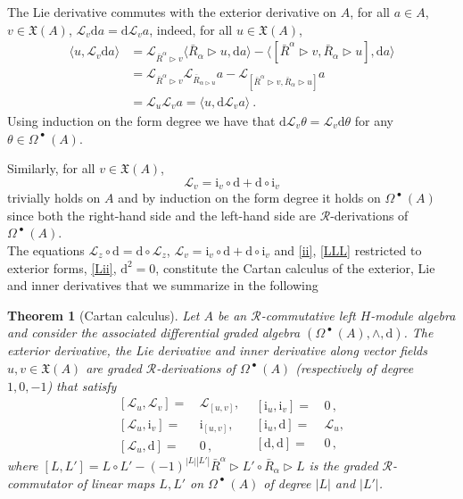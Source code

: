 \documentclass[12pt]{article}
\numberwithin{equation}{section}
\theoremstyle{plain}
\newtheorem{theorem}[proposition]{Theorem}
\theoremstyle{definition}
\theoremstyle{remark}
\def\Vect{\mathfrak{X}}
\def\dd{\mathrm{d}}
\def\ra{\triangleright}
\def\LLL{\mathscr{L}^{\mathcal{}}}
\def\LL{\mathscr{L}^{\mathcal{}}}
\def\le{\langle}
\def\re{\rangle}
\def\le{\langle}
\def\re{\rangle}
\def\dd{{\nabla}}
\def\ii{\mathrm{i}}
\def\oR{\bar R}
\def\al{\alpha}
\def\dd{\mathrm{d}}
\def\OM{{\Omega^{\!\!\;\bullet}\!\!\:(A)}}
\begin{document}
The Lie derivative commutes with the exterior derivative on $A$, for
all $a\in A$, $v\in \Vect(A)$, 
$\LLL_v\dd a=\dd \LLL_v a$, indeed, for all $u \in \Vect(A)$,
\begin{equation*}
  \begin{split}\le u,\LLL_v\dd a\re&=\LL_{\oR^\al\ra v}\le\oR_\al\ra u,\dd
  a\re-\le[\oR^\al\ra v,\oR_\al\ra u],\dd
  a\re \\
 & =\LL_{\oR^\al \ra v}\LL_{\oR_{\al\ra u}} a-\LL_{[\oR^\al\ra v,\oR_\al\ra
    u]}a\\[.2em]
  &=\LL_u\LL_va
  =\le u,\dd\LL_v a\re~.
\end{split}
\end{equation*}
Using induction on the form degree we have that $\dd
\LLL_v\theta=\LLL_v\dd\theta$ for any $\theta\in \OM$.

Similarly, for all $v\in \Vect(A)$,
$$\LLL_v=\ii_v\circ \dd+\dd\circ \ii_v$$ trivially holds on $A$ and  by
induction on the form degree it holds on
$\OM$ since both the right-hand side and the left-hand side are
 ${\mathcal{R}}$-derivations of
$\OM$.
\\

The equations $\LLL_z\circ \dd =\dd\circ \LLL_z$, $\LLL_v=\ii_v\circ \dd+\dd\circ \ii_v $ and  \eqref{ii}, \eqref{LLL} restricted to exterior forms,
\eqref{Lii}, $\dd^2=0$,  constitute the Cartan calculus of the
exterior, Lie and inner derivatives \cite{Gurevich, Weber} that we
summarize in the following


\begin{theorem}[Cartan calculus]
Let ${A}$ be an  ${\mathcal{R}}$-commutative left $H$-module algebra
and consider the associated differential graded algebra
$(\OM,\wedge,\mathrm{d})$. 
The exterior derivative, the Lie derivative and inner derivative along vector fields
$u,v\in \Vect(A)$ are graded  ${\mathcal{R}}$-derivations of
$\OM$ (respectively of degree $1,0,
-1$) that 
 satisfy
\begin{equation*}
\begin{split}
        [\LLL_u,\LLL_v]
        =&\,\LLL_{[u,v]},~~\\
        [\LLL_u,\ii_v]
        =&\,\ii_{[u,v]},\\
        [\LLL_u,\mathrm{d}]=&\,0\,,
\end{split}
\begin{split}
        [\ii_u,\ii_v]=&\,0\,,\\
        [\ii_u,\mathrm{d}]
        =&\,\LLL_u,\\
        [\mathrm{d},\mathrm{d}]=&\,0\,,
\end{split}
\end{equation*}
where 
$[L,L']=L\circ L'-(-1)^{|L||L'|}\oR^\al\ra L'\circ \oR_\al\ra L$
is the graded  ${\mathcal{R}}$-commutator of linear maps $L,L'$  on
$\OM$ of
degree $|L|$ and $|L'|$.
\end{theorem}
\end{document}
